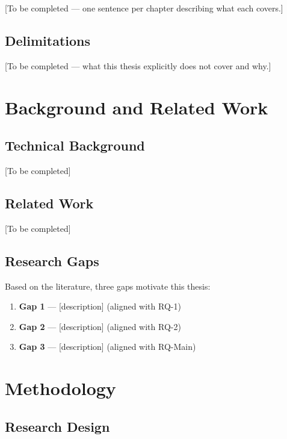 \documentclass[12pt, a4paper]{report}
\begin{document}
[To be completed — one sentence per chapter describing what each covers.]

\section{Delimitations}
\label{sec:delimitations}

[To be completed — what this thesis explicitly does not cover and why.]

\chapter{Background and Related Work}
\label{ch:background}

\section{Technical Background}
\label{sec:background}

[To be completed]

\section{Related Work}
\label{sec:related}

[To be completed]

\section{Research Gaps}
\label{sec:gaps}

Based on the literature, three gaps motivate this thesis:

\begin{enumerate}
    \item \textbf{Gap 1} — [description] (aligned with RQ-1)
    \item \textbf{Gap 2} — [description] (aligned with RQ-2)
    \item \textbf{Gap 3} — [description] (aligned with RQ-Main)
\end{enumerate}

\chapter{Methodology}
\label{ch:methodology}

\section{Research Design}
\label{sec:design}
\end{document}
